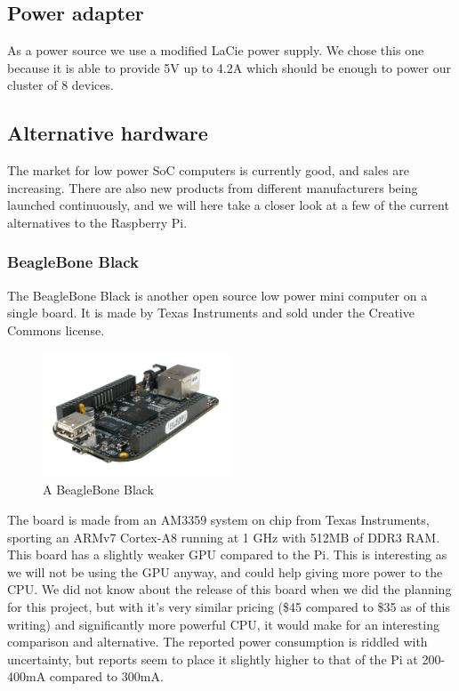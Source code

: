 \subsection{Power adapter}
As a power source we use a modified LaCie power supply. We chose this one because it is able to provide 5V up to 4.2A which should be enough to power our cluster of 8 devices.

\subsection{Alternative hardware}
The market for low power SoC computers is currently good, and sales are increasing\cite{growing_market}.
There are also new products from different manufacturers being launched continuously, and we will here take a closer look at a few of the current alternatives to the Raspberry Pi.

\subsubsection{BeagleBone Black}

The BeagleBone Black is another open source low power mini computer on a single board. It is made by Texas Instruments and sold under the Creative Commons license.

\begin{figure}[h]
	\centering
    \includegraphics[width=0.5\textwidth]{hardware/beaglebone.jpg}
    \caption{A BeagleBone Black}
    \label{fig:beaglebone}
\end{figure}

The board is made from an AM3359 system on chip from Texas Instruments, sporting an ARMv7 Cortex-A8 running at 1 GHz with 512MB of DDR3 RAM. This board has a slightly weaker GPU compared to the Pi. This is interesting as we will not be using the GPU anyway, and could help giving more power to the CPU.
We did not know about the release of this board when we did the planning for this project, but with it's very similar pricing (\$45 compared to \$35 as of this writing) and significantly more powerful CPU, it would make for an interesting comparison and alternative. The reported power consumption is riddled with uncertainty, but reports seem to place it slightly higher to that of the Pi at 200-400mA compared to 300mA.

